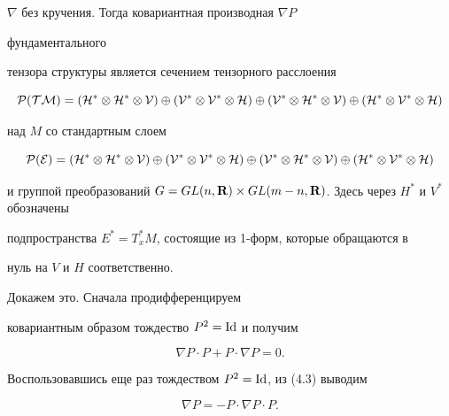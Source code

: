 $\nabla$ без кручения. Тогда ковариантная производная $\nabla P$ 


фундаментального 


тензора структуры является сечением тензорного расслоения 


\begin{equation} 


\cal P(TM)=(\cal H^*\otimes\cal H^*\otimes\cal V)\oplus 


(\cal V^*\otimes\cal V^*\otimes\cal H)\oplus 


(\cal V^*\otimes\cal H^*\otimes\cal V)\oplus 


(\cal H^*\otimes\cal V^*\otimes\cal H) 


\end{equation} 


над $M$ со стандартным слоем 


\begin{equation} 


\cal P(E)=(H^*\otimes H^*\otimes V)\oplus 


(V^*\otimes V^*\otimes H)\oplus 


(V^*\otimes H^*\otimes V)\oplus 


(H^*\otimes V^*\otimes H) 


\end{equation} 


и группой преобразований $G=GL(n,\bold R)\times GL(m-n,\bold R)$. Здесь через $H^*$ и $V^*$ обозначены 


подпространства $E^*=T^*_x M$, состоящие из 1-форм, которые обращаются в 


нуль на $V$ и $H$ соответственно.





Докажем это. Сначала продифференцируем 


ковариантным образом тождество $P^2=\operatorname{Id}$ и получим 


\begin{equation} 


\nabla P\cdot P+P\cdot\nabla P=0. 


\end{equation} 


Воспользовавшись еще раз тождеством $P^2=\operatorname{Id}$, из (4.3) выводим 


\begin{equation} 


\nabla P=-P\cdot\nabla P\cdot P. 


\end{equation} 



